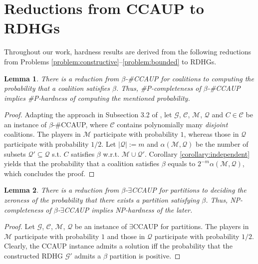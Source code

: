 \documentclass[letterpaper]{article} %
\newtheorem{lemma}{Lemma}
\begin{document}
\section{Reductions from CCAUP to RDHGs}
Throughout our work, hardness results are derived from the following reductions from Problems \ref{problem:constructive}--\ref{problem:bounded} to RDHGs.
\begin{lemma}
\label{lemma:connection coalitions}
There is a reduction from $\beta$-\#CCAUP for coalitions to computing the probability that a coalition satisfies $\beta$. Thus, \#P-completeness of $\beta$-\#CCAUP implies \#P-hardness of computing the mentioned probability.
\end{lemma}
\begin{proof}
Adapting the approach in Subsection 3.2 of \cite{imber2021probabilistic}, let $\mathcal{G}$, $\mathcal{C}$, $\mathcal{M}$, $\mathcal{Q}$ and $C \in \mathcal{C}$ be an instance of $\beta$-\#CCAUP, where $\mathcal{C}$ contains polynomially many \textit{disjoint} coalitions. The players in $\mathcal{M}$ participate with probability $1$, whereas those in $\mathcal{Q}$ participate with probability $1/2$. Let $|\mathcal{Q}| := m$ and $\alpha(\mathcal{M}, \mathcal{Q})$ be the number of subsets $\mathcal{Q}' \subseteq \mathcal{Q}$ s.t. $C$ satisfies $\beta$ w.r.t. $\mathcal{M} \cup \mathcal{Q}'$. Corollary \ref{corollary:independent} yields that the probability that a coalition satisfies $\beta$ equals to $2^{-m} \alpha(\mathcal{M}, \mathcal{Q})$, which concludes the proof.
\end{proof}

\begin{lemma}
\label{lemma:connection partitions}
There is a reduction from $\beta$-$\exists$CCAUP for partitions to deciding the zeroness of the probability that there exists a partition satisfying $\beta$. Thus, NP-completeness of $\beta$-$\exists$CCAUP implies NP-hardness of the later.
\end{lemma}
\begin{proof}
Let $\mathcal{G}$, $\mathcal{C}$, $\mathcal{M}$, $\mathcal{Q}$ be an instance of $\exists$CCAUP for partitions. The players in $\mathcal{M}$ participate with probability $1$ and those in $\mathcal{Q}$ participate with probability $1/2$. Clearly, the CCAUP instance admits a solution iff the probability that the constructed RDHG $\mathcal{G}'$ admits a $\beta$ partition is positive.
\end{proof}
\end{document}
